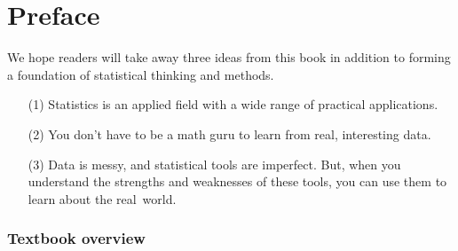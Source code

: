\chapter*{Preface}




\noindent We hope readers will take away three ideas from this book in addition to forming a foundation of statistical thinking and methods.\vspace{-1mm}
\begin{enumerate}
\setlength{\itemsep}{0mm}
\item[(1)] Statistics is an applied field with a wide range of practical applications.
\item[(2)] You don't have to be a math guru to learn from real, interesting data.
\item[(3)] Data is messy, and statistical tools are imperfect. But, when you understand the strengths and weaknesses of these tools, you can use them to learn about the real~world.
\end{enumerate}


\subsection*{Textbook overview}

